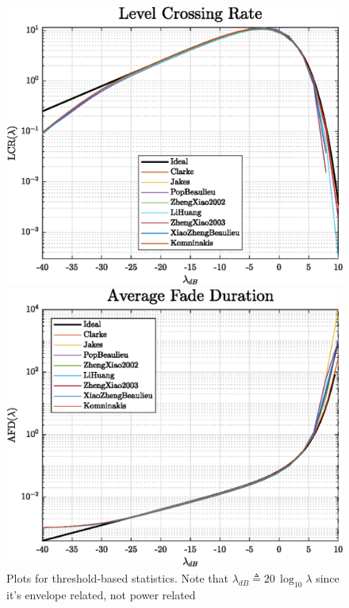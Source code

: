 \begin{figure}
	\hfill
	\begin{minipage}{.45\linewidth}
		\includegraphics[width=\linewidth]{img/LCR.eps}
	\end{minipage}
	\hfill
	\begin{minipage}{.45\linewidth}
		\includegraphics[width=\linewidth]{img/AFD.eps}
	\end{minipage}
	\hfill
	
	\caption{Plots for threshold-based statistics. Note that $\lambda_{dB} \triangleq 20\, \log_{10} \lambda$ since it's envelope related, not power related}
	\label{fig:LCR_AFD}
\end{figure}

